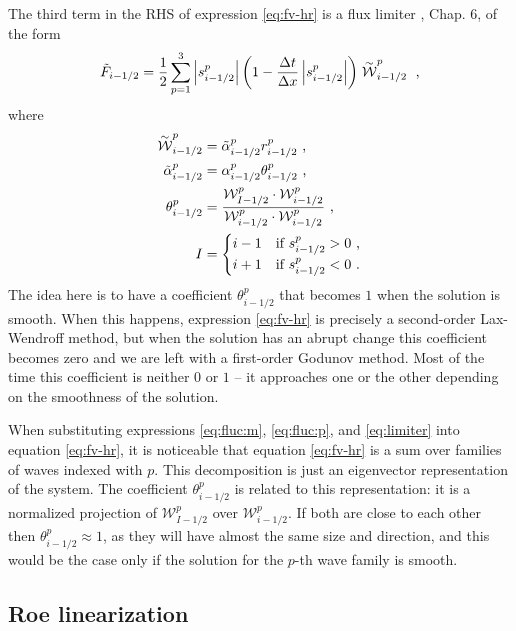The third term in the RHS of expression \eqref{eq:fv-hr} is a flux limiter \citep{leveque-book-fv}, Chap. 6, of the form
\begin{align}
  \label{eq:limiter}
  \tilde{F}_{i-1/2}
  =
  \frac{1}{2}
  \sum_{p=1}^3
  \left|s_{i-1/2}^p\right|
  \left(
    1-
    \frac{\Delta t}{\Delta x}
    \left|s_{i-1/2}^p\right|
  \right)
  \Wtilde^p_{i-1/2}
  \p{,}
\end{align}
where
\begin{align*}
  \Wtilde^p_{i-1/2} 
  &= \tilde{\alpha}^p_{i-1/2}r^p_{i-1/2} 
  \p{,}
  \\
  \tilde{\alpha}_{i-1/2}^p 
  &= \alpha_{i-1/2}^p \theta_{i-1/2}^p 
  \p{,}
  \\
  \theta_{i-1/2}^p
  &=
  \frac{\mathcal{W}_{I-1/2}^p\cdot\mathcal{W}_{i-1/2}^p}
  {\mathcal{W}_{i-1/2}^p\cdot\mathcal{W}_{i-1/2}^p}
  \p{,}
  \\
  I &=
  \begin{cases}
    i-1 & \text{if } s_{i-1/2}^p > 0  \p{,}\\
    i+1 & \text{if } s_{i-1/2}^p < 0  \p{.}
  \end{cases}
\end{align*}
The idea here is to have a coefficient $\theta_{i-1/2}^p$ that becomes  $1$ when the solution is smooth. When this happens, expression \eqref{eq:fv-hr} is precisely a second-order Lax-Wendroff method, but when the solution has an abrupt change this coefficient becomes zero and we are left with a first-order Godunov method. Most of the time this coefficient is neither $0$ or $1$ -- it approaches one or the other depending on the smoothness of the solution.

When substituting expressions \eqref{eq:fluc:m}, \eqref{eq:fluc:p}, and \eqref{eq:limiter} into equation \eqref{eq:fv-hr}, it is noticeable  that equation \eqref{eq:fv-hr} is a sum over families of waves indexed with $p$. 
This decomposition is just an eigenvector representation of the system.
The coefficient $\theta_{i-1/2}^p$ is related to this representation: it is a normalized projection of $\mathcal{W}_{I-1/2}^p$ over $\mathcal{W}_{i-1/2}^p$. If both are close to each other then $\theta_{i-1/2}^p \approx 1$, as they will have almost the same size and direction, and this would be the case only if the solution for the $p$-th wave family is smooth.

\subsection{Roe linearization}
\label{sec:roe}

